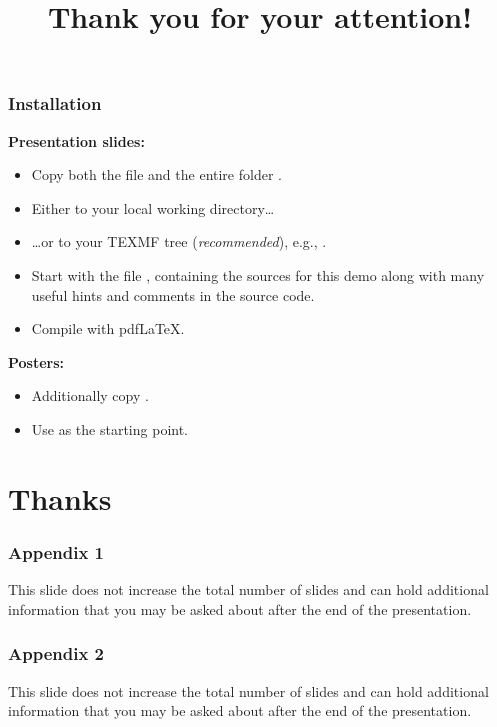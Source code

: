 \documentclass[11pt,t,usepdftitle=false,aspectratio=169]{beamer}
\begin{document}
\begin{frame}[fragile]
\frametitle{Installation}

   \textbf{Presentation slides:}
   \begin{itemize}
      \item Copy both the file  and the entire folder .
  
      \item Either to your local working directory\dots
  
      \item \dots or to your TEXMF tree (\emph{recommended}), e.g., .
  
      \item Start with the file , containing the sources for this demo
        along with many useful hints and comments in the source code.
    
      \item Compile with pdf{\LaTeX}.
   \end{itemize}

\medskip

   \textbf{Posters:}
   \begin{itemize}
      \item Additionally copy .
      \item Use  as the starting point.
   \end{itemize}

\end{frame}


\title{Thank you for your attention!}
\subtitle{}
\section{Thanks}


\appendix

\begin{frame}
\frametitle{Appendix 1}
    This slide does not increase the total number of slides and can hold additional information
    that you may be asked about after the end of the presentation.
\end{frame}

\begin{frame}
\frametitle{Appendix 2}
    This slide does not increase the total number of slides and can hold additional information
    that you may be asked about after the end of the presentation.
\end{frame}
\end{document}
